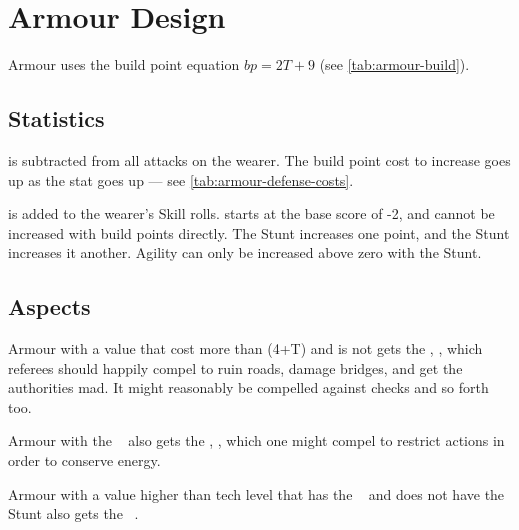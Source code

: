 \iflandscape{}{\newpage}
\section[Personal Armour Design]{Armour Design}\label{sec:personal-armour-design} %

Armour uses the build point equation $bp = 2T + 9$ (see \autoref{tab:armour-build}).



\subsection{Statistics}
\label{sec:personal-armour-statistics}

 is subtracted from all attacks on the wearer. The build point cost to increase  goes up as the stat goes up --- see \autoref{tab:armour-defense-costs}.

 is added to the wearer's  Skill rolls.  starts at the base score of -2, and cannot be increased with build points directly. The  Stunt increases  one point, and the  Stunt increases it another. Agility can only be increased above zero with the  Stunt.



\subsection[Personal Armour Aspects]{Aspects}
\label{sec:personal-armour-aspects}

Armour with a  value that cost more than (4+T) and is not  gets the \Aspect, , which referees should happily compel to ruin roads, damage bridges, and get the authorities mad. It might reasonably be compelled against  checks and so forth too.

Armour with the \Stunt\  also gets the \Aspect, , which one might compel to restrict actions in order to conserve energy.

Armour with a  value higher than tech level that has the \Stunt\  and does not have the Stunt  also gets the \Aspect\ .

